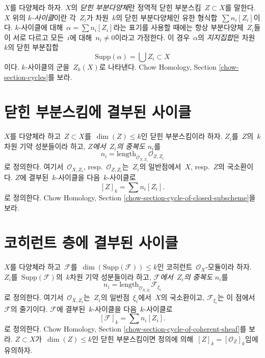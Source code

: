 \noindent
$X$를 다양체라 하자. $X$의 {\it 닫힌 부분다양체}란 정역적 닫힌 부분스킴\ 
$Z \subset X$를 말한다. $X$ 위의 {\it $k$-사이클}이란 각\  $Z_i$가 차원\ 
$k$의 닫힌 부분다양체인 유한 형식합\  $\sum n_i [Z_i]$이다.
$k$-사이클에 대해\  $\alpha = \sum n_i[Z_i]$라는 표기를 사용할 때에는 항상
부분다양체\  $Z_i$들이 서로 다르고 모든\  $i$에 대해\  $n_i \not = 0$이라고
가정한다. 이 경우\  $\alpha$의 {\it 지지집합}은 차원\  $k$의 닫힌 부분집합
$$
\text{Supp}(\alpha) = \bigcup Z_i \subset X
$$
이다. $k$-사이클의 군을\  $Z_k(X)$로 나타낸다.
Chow Homology, Section \ref{chow-section-cycles}를 보라.


\section{닫힌 부분스킴에 결부된 사이클}
\label{section-cycle-of-closed}

\noindent
$X$를 다양체라 하고\  $Z \subset X$를\  $\dim(Z) \leq k$인 닫힌 부분스킴이라
하자. $Z_i$를\  $Z$의\  $k$차원 기약 성분들이라 하고, {\it $Z$에서\  $Z_i$의
중복도} $n_i$를
$$
n_i = \text{length}_{\mathcal{O}_{X, Z_i}} \mathcal{O}_{Z, Z_i}
$$
로 정의한다. 여기서\  $\mathcal{O}_{X, Z_i}$, resp.\ $\mathcal{O}_{Z, Z_i}$는\ 
$Z_i$의 일반점에서\  $X$, resp.\ $Z$의 국소환이다. $Z$에 결부된\  $k$-사이클을
다음\  $k$-사이클로
$$
[Z]_k = \sum n_i [Z_i].
$$
로 정의한다. Chow Homology, Section
\ref{chow-section-cycle-of-closed-subscheme}을 보라.


\section{코히런트 층에 결부된 사이클}
\label{section-cycle-of-coherent-sheaf}

\noindent
$X$를 다양체라 하고\  $\mathcal{F}$를\ 
$\dim(\text{Supp}(\mathcal{F})) \leq k$인 코히런트\ 
$\mathcal{O}_X$-모듈이라 하자.
$Z_i$를\  $\text{Supp}(\mathcal{F})$의\  $k$차원 기약 성분들이라 하고,
{\it $\mathcal{F}$에서\  $Z_i$의 중복도} $n_i$를
$$
n_i = \text{length}_{\mathcal{O}_{X, Z_i}} \mathcal{F}_{\xi_i}
$$
로 정의한다. 여기서\  $\mathcal{O}_{X, Z_i}$는\  $Z_i$의 일반점\  $\xi_i$에서\ 
$X$의 국소환이고, $\mathcal{F}_{\xi_i}$는 이 점에서\  $\mathcal{F}$의
줄기이다. $\mathcal{F}$에 결부된\  $k$-사이클을 다음\  $k$-사이클로
$$
[\mathcal{F}]_k = \sum n_i [Z_i].
$$
로 정의한다. Chow Homology, Section
\ref{chow-section-cycle-of-coherent-sheaf}를 보라.
$Z \subset X$가\  $\dim(Z) \leq k$인 닫힌 부분스킴이면 정의에 의해\ 
$[Z]_k = [\mathcal{O}_Z]_k$임에 유의하자.


